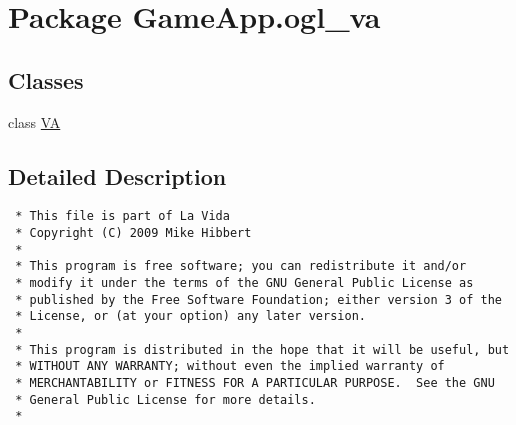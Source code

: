 \hypertarget{namespaceGameApp_1_1ogl__va}{
\section{Package GameApp.ogl\_\-va}
\label{namespaceGameApp_1_1ogl__va}
}


\subsection*{Classes}
\begin{CompactItemize}
\item 
class \hyperlink{classGameApp_1_1ogl__va_1_1VA}{VA}
\end{CompactItemize}


\subsection{Detailed Description}


\footnotesize\begin{verbatim}
 * This file is part of La Vida
 * Copyright (C) 2009 Mike Hibbert
 *
 * This program is free software; you can redistribute it and/or
 * modify it under the terms of the GNU General Public License as
 * published by the Free Software Foundation; either version 3 of the
 * License, or (at your option) any later version.
 *
 * This program is distributed in the hope that it will be useful, but
 * WITHOUT ANY WARRANTY; without even the implied warranty of
 * MERCHANTABILITY or FITNESS FOR A PARTICULAR PURPOSE.  See the GNU
 * General Public License for more details.
 *
\end{verbatim}
\normalsize
 